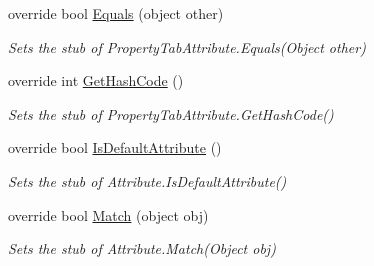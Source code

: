 \begin{DoxyCompactItemize}
override bool \hyperlink{class_system_1_1_component_model_1_1_fakes_1_1_stub_property_tab_attribute_a2be58cceb061ece6c18399fb2b9406b4}{Equals} (object other)
\begin{DoxyCompactList}\small\item\em Sets the stub of Property\-Tab\-Attribute.\-Equals(\-Object other)\end{DoxyCompactList}\item 
override int \hyperlink{class_system_1_1_component_model_1_1_fakes_1_1_stub_property_tab_attribute_ae9f6cdfa84ebf7faf955579e373d72ee}{Get\-Hash\-Code} ()
\begin{DoxyCompactList}\small\item\em Sets the stub of Property\-Tab\-Attribute.\-Get\-Hash\-Code()\end{DoxyCompactList}\item 
override bool \hyperlink{class_system_1_1_component_model_1_1_fakes_1_1_stub_property_tab_attribute_ae125d0f53508616dfc1a4a19fe9b8ebe}{Is\-Default\-Attribute} ()
\begin{DoxyCompactList}\small\item\em Sets the stub of Attribute.\-Is\-Default\-Attribute()\end{DoxyCompactList}\item 
override bool \hyperlink{class_system_1_1_component_model_1_1_fakes_1_1_stub_property_tab_attribute_a0e78c489cc884ca5360a90678d24a2ef}{Match} (object obj)
\begin{DoxyCompactList}\small\item\em Sets the stub of Attribute.\-Match(\-Object obj)\end{DoxyCompactList}\end{DoxyCompactItemize}
